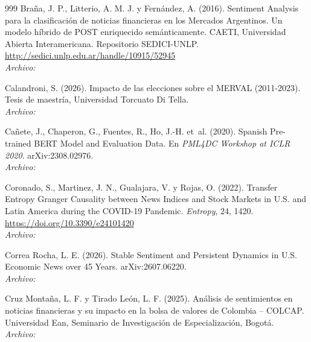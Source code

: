 \begin{thebibliography}{999}
Bra{\~n}a, J. P., Litterio, A. M. J. y Fern{\'a}ndez, A. (2016). Sentiment Analysis para la clasificaci{\'o}n de noticias financieras en los Mercados Argentinos. Un modelo h{\'i}brido de POST enriquecido sem{\'a}nticamente. CAETI, Universidad Abierta Interamericana. Repositorio SEDICI-UNLP. \url{http://sedici.unlp.edu.ar/handle/10915/52945}
\\\textit{Archivo:} 

Calandroni, S. (2026). Impacto de las elecciones sobre el MERVAL (2011-2023). Tesis de maestría, Universidad Torcuato Di Tella.
\\\textit{Archivo:} 

Ca{\~n}ete, J., Chaperon, G., Fuentes, R., Ho, J.-H. et~al. (2020). Spanish Pre-trained {BERT} Model and Evaluation Data. En \emph{PML4DC Workshop at ICLR 2020}. arXiv:2308.02976.
\\\textit{Archivo:} 

Coronado, S., Martinez, J. N., Gualajara, V. y Rojas, O. (2022). Transfer Entropy Granger Causality between News Indices and Stock Markets in {U.S.} and {Latin America} during the {COVID-19} Pandemic. \emph{Entropy}, 24, 1420. \url{https://doi.org/10.3390/e24101420}
\\\textit{Archivo:} 

Correa Rocha, L. E. (2026). Stable Sentiment and Persistent Dynamics in {U.S.} Economic News over 45 Years. arXiv:2607.06220.
\\\textit{Archivo:} 

Cruz Monta{\~n}a, L. F. y Tirado Le{\'o}n, L. F. (2025). An{\'a}lisis de sentimientos en noticias financieras y su impacto en la bolsa de valores de {Colombia} -- {COLCAP}. Universidad Ean, Seminario de Investigaci{\'o}n de Especializaci{\'o}n, Bogot{\'a}.
\\\textit{Archivo:} 


\end{thebibliography}
